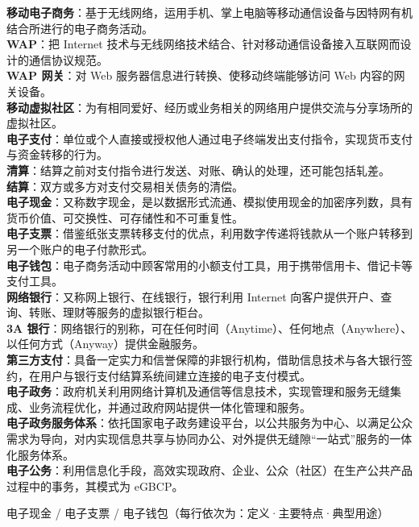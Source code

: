 \documentclass[a4paper,11pt]{article}
\begin{document}
\begin{keyterms}
\textbf{移动电子商务}：基于无线网络，运用手机、掌上电脑等移动通信设备与因特网有机结合所进行的电子商务活动。\\
\textbf{WAP}：把 Internet 技术与无线网络技术结合、针对移动通信设备接入互联网而设计的通信协议规范。\\
\textbf{WAP 网关}：对 Web 服务器信息进行转换、使移动终端能够访问 Web 内容的网关设备。\\
\textbf{移动虚拟社区}：为有相同爱好、经历或业务相关的网络用户提供交流与分享场所的虚拟社区。\\
\textbf{电子支付}：单位或个人直接或授权他人通过电子终端发出支付指令，实现货币支付与资金转移的行为。\\
\textbf{清算}：结算之前对支付指令进行发送、对账、确认的处理，还可能包括轧差。\\
\textbf{结算}：双方或多方对支付交易相关债务的清偿。\\
\textbf{电子现金}：又称数字现金，是以数据形式流通、模拟使用现金的加密序列数，具有货币价值、可交换性、可存储性和不可重复性。\\
\textbf{电子支票}：借鉴纸张支票转移支付的优点，利用数字传递将钱款从一个账户转移到另一个账户的电子付款形式。\\
\textbf{电子钱包}：电子商务活动中顾客常用的小额支付工具，用于携带信用卡、借记卡等支付工具。\\
\textbf{网络银行}：又称网上银行、在线银行，银行利用 Internet 向客户提供开户、查询、转账、理财等服务的虚拟银行柜台。\\
\textbf{3A 银行}：网络银行的别称，可在任何时间（Anytime）、任何地点（Anywhere）、以任何方式（Anyway）提供金融服务。\\
\textbf{第三方支付}：具备一定实力和信誉保障的非银行机构，借助信息技术与各大银行签约，在用户与银行支付结算系统间建立连接的电子支付模式。\\
\textbf{电子政务}：政府机关利用网络计算机及通信等信息技术，实现管理和服务无缝集成、业务流程优化，并通过政府网站提供一体化管理和服务。\\
\textbf{电子政务服务体系}：依托国家电子政务建设平台，以公共服务为中心、以满足公众需求为导向，对内实现信息共享与协同办公、对外提供无缝隙“一站式”服务的一体化服务体系。\\
\textbf{电子公务}：利用信息化手段，高效实现政府、企业、公众（社区）在生产公共产品过程中的事务，其模式为 eGBCP。
\end{keyterms}

\begin{contrast}{电子现金 / 电子支票 / 电子钱包（每行依次为：定义·主要特点·典型用途）}
\end{contrast}
\end{document}
